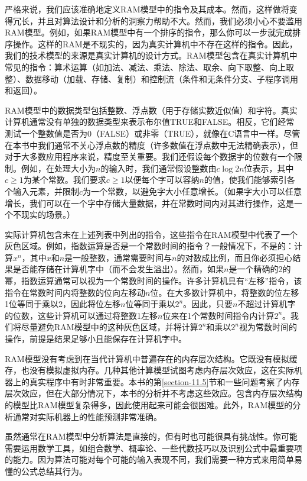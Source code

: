 \documentclass[lang=cn,newtx,10pt,scheme=chinese]{elegantbook}
\begin{document}
严格来说，我们应该准确地定义RAM模型中的指令及其成本。然而，这样做将变得冗长，并且对算法设计和分析的洞察力帮助不大。然而，我们必须小心不要滥用RAM模型。例如，如果RAM模型中有一个排序的指令，那么你可以一步就完成排序操作。这样的RAM是不现实的，因为真实计算机中不存在这样的指令。因此，我们的技术模型的来源是真实计算机的设计方式。RAM模型包含在真实计算机中常见的指令：算术运算（如加法、减法、乘法、除法、取余、向下取整、向上取整）、数据移动（加载、存储、复制）和控制流（条件和无条件分支、子程序调用和返回）。

RAM模型中的数据类型包括整数、浮点数（用于存储实数近似值）和字符。真实计算机通常没有单独的数据类型来表示布尔值TRUE和FALSE。相反，它们经常测试一个整数值是否为0（FALSE）或非零（TRUE），就像在C语言中一样。尽管在本书中我们通常不关心浮点数的精度（许多数值在浮点数中无法精确表示），但对于大多数应用程序来说，精度至关重要。我们还假设每个数据字的位数有一个限制。例如，在处理大小为$n$的输入时，我们通常假设整数由$c\log 2n$位表示，其中$c \ge 1$为某个常数。我们要求$c \ge 1$以便每个字可以容纳$n$的值，使我们能够索引各个输入元素，并限制$c$为一个常数，以避免字大小任意增长。（如果字大小可以任意增长，我们可以在一个字中存储大量数据，并在常数时间内对其进行操作，这是一个不现实的场景。）

实际计算机包含未在上述列表中列出的指令，这些指令在RAM模型中代表了一个灰色区域。例如，指数运算是否是一个常数时间的指令？一般情况下，不是的：计算$x^n$，其中$x$和$n$是一般整数，通常需要时间与$n$的对数成比例，而且你必须担心结果是否能存储在计算机字中（而不会发生溢出）。然而，如果$n$是一个精确的2的幂，指数运算通常可以视为一个常数时间的操作。许多计算机具有``左移''指令，该指令在常数时间内将整数的位向左移动$n$位。在大多数计算机中，将整数的位左移1位等同于乘以2，因此将位左移$n$位等同于乘以$2^n$。因此，只要$n$不超过计算机字的位数，这些计算机可以通过将整数1左移$n$位来在1个常数时间指令内计算$2^n$。我们将尽量避免RAM模型中的这种灰色区域，并将计算$2^n$和乘以$2^n$视为常数时间的操作，前提是结果足够小且能保存在计算机字中。

RAM模型没有考虑到在当代计算机中普遍存在的内存层次结构。它既没有模拟缓存，也没有模拟虚拟内存。几种其他计算模型试图考虑内存层次效应，这在实际机器上的真实程序中有时非常重要。本书的第\ref{section-11.5}节和一些问题考察了内存层次效应，但在大部分情况下，本书的分析并不考虑这些效应。包含内存层次结构的模型比RAM模型复杂得多，因此使用起来可能会很困难。此外，RAM模型的分析通常对实际机器上的性能预测非常准确。

虽然通常在RAM模型中分析算法是直接的，但有时也可能很具有挑战性。你可能需要运用数学工具，如组合数学、概率论、一些代数技巧以及识别公式中最重要项的能力。因为算法可能对每个可能的输入表现不同，我们需要一种方式来用简单易懂的公式总结其行为。
\end{document}
